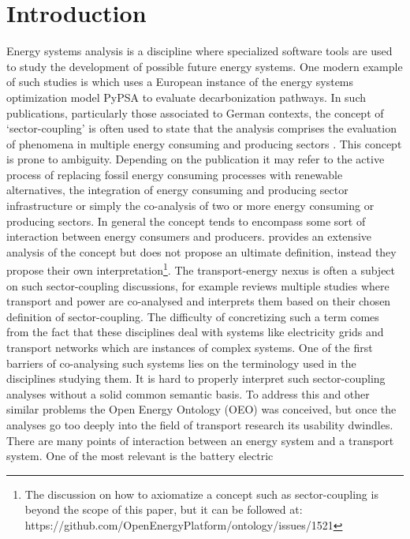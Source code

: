 ﻿\section{Introduction}
\label{introduction}
Energy systems analysis is a discipline where specialized software tools are
used to study the development of possible future energy systems. One modern
example of such studies is \cite{Victoria.2022} which uses a European instance
of the energy systems optimization model PyPSA \cite{Brown.2018} to evaluate
decarbonization pathways. In such publications, particularly those associated to
German contexts, the concept of `sector-coupling' is often used to state that
the analysis comprises the evaluation of phenomena in multiple energy consuming
and producing sectors \cite{Fridgen.2020}. This concept is prone to ambiguity.
Depending on the publication it may refer to the active process of replacing
fossil energy consuming processes with renewable alternatives, the integration
of energy consuming and producing sector infrastructure or simply the
co-analysis of two or more energy consuming or producing sectors. In general the
concept tends to encompass some sort of interaction between energy consumers and
producers. \cite{Ramsebner.2021} provides an extensive analysis of the concept
but does not propose an ultimate definition, instead they propose their own
interpretation\footnote{The discussion on how to axiomatize a concept such as
sector-coupling is beyond the scope of this paper, but it can be followed at:
https://github.com/OpenEnergyPlatform/ontology/issues/1521}. The
transport-energy nexus is often a subject on such sector-coupling discussions,
for example \cite{Robinius.2017} reviews multiple studies where transport and
power are co-analysed and interprets them based on their chosen definition of
sector-coupling. The difficulty of concretizing such a term comes from the fact
that these disciplines deal with systems like electricity grids and transport
networks which are instances of complex systems. One of the first barriers of
co-analysing  such systems lies on the terminology used in the disciplines
studying them. It is hard to properly interpret such sector-coupling analyses
without a solid common semantic basis. To address this and other similar
problems the Open Energy Ontology (OEO) \cite{Booshehri.2021} was conceived, but
once the analyses go too deeply into the field of transport research its
usability dwindles. There are many points of interaction between an energy
system and a transport system. One of the most relevant is the battery electric
